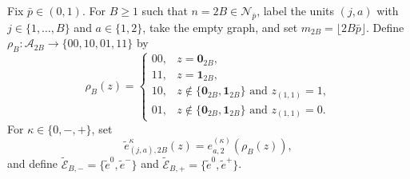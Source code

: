Fix \(\bar p\in(0,1)\).  For \(B\ge1\) such that \(n=2B\in\mathcal N_{\bar p}\), label the units \((j,a)\) with \(j\in\{1,\ldots,B\}\) and \(a\in\{1,2\}\), take the empty graph, and set \(m_{2B}=\lfloor2B\bar p\rfloor\).  Define \(\rho_B:\mathcal A_{2B}\to\{00,10,01,11\}\) by
\[
 \rho_B(z)=
 \begin{cases}
 00,&z=\mathbf 0_{2B},\\
 11,&z=\mathbf 1_{2B},\\
 10,&z\notin\{\mathbf 0_{2B},\mathbf 1_{2B}\}\text{ and }z_{(1,1)}=1,\\
 01,&z\notin\{\mathbf 0_{2B},\mathbf 1_{2B}\}\text{ and }z_{(1,1)}=0.
 \end{cases}
\]
For \(\kappa\in\{0,-,+\}\), set
\[
 \widetilde e^{\kappa}_{(j,a),2B}(z)
 =e^{(\kappa)}_{a,2}(\rho_B(z)),
\]
and define \(\widetilde{\mathcal E}_{B,-}=\{\widetilde e^0,\widetilde e^-\}\) and \(\widetilde{\mathcal E}_{B,+}=\{\widetilde e^0,\widetilde e^+\}\).